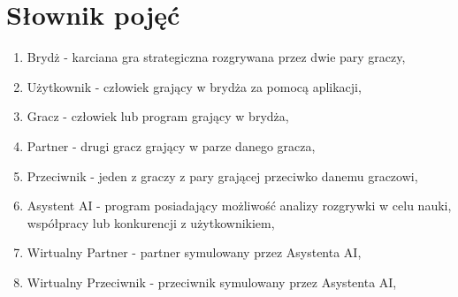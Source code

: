 \FloatBarrier


\section{Słownik pojęć}

\begin{enumerate}
  \item Brydż - karciana gra strategiczna rozgrywana przez dwie pary graczy,
  \item Użytkownik - człowiek grający w brydża za pomocą aplikacji,
  \item Gracz - człowiek lub program grający w brydża,
  \item Partner - drugi gracz grający w parze danego gracza,
  \item Przeciwnik - jeden z graczy z pary grającej przeciwko danemu graczowi,
  \item Asystent AI - program posiadający możliwość analizy rozgrywki w celu nauki, współpracy lub konkurencji z użytkownikiem,
  \item Wirtualny Partner - partner symulowany przez Asystenta AI,
  \item Wirtualny Przeciwnik - przeciwnik symulowany przez Asystenta AI,
\end{enumerate}